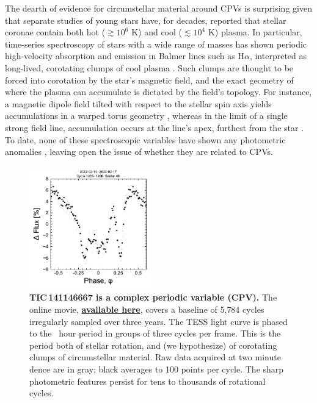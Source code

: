 \documentclass[11pt,twocolumn,tighten,linenumbers]{aastex7}
\begin{document}
The dearth of evidence for circumstellar material around CPVs is
surprising given that separate studies of young stars have, for
decades, reported that stellar coronae contain both hot
($\gtrsim$$10^6$ K) and cool ($\lesssim$$10^4$ K) plasma. In
particular, time-series spectroscopy of stars with a wide range of
masses has shown periodic high-velocity absorption and emission in
Balmer lines such as H$\alpha$, interpreted as long-lived, corotating
clumps of cool plasma
\citep{CollierCameron1989,CollierCameron1992,Barnes2000,Donati2000,Dunstone2006,Skelly2008,Leitzinger2016,Cang2021}.
Such clumps are thought to be forced into corotation by the star's magnetic
field, and the exact geometry of where the plasma can accumulate is
dictated by the field's topology.  For instance, a magnetic dipole
field tilted with respect to the stellar spin axis yields
accumulations in a warped torus geometry \citep{Townsend2005}, whereas
in the limit of a single strong field line, accumulation occurs at the
line's apex, furthest from the star \citep{Waugh2022}.  To date, none
of these spectroscopic variables have shown any photometric anomalies
\citep{Bouma2024}, leaving open the issue of whether they are related
to CPVs.

\begin{figure}[!t]
  \centering
  \includegraphics[width=0.47\textwidth]{figures/f1.pdf}
  \vspace{-0.3cm}
  \captionsetup{labelformat=moviefmt,labelsep=colon}
	\caption{\textbf{TIC\,141146667 is a complex periodic variable (CPV).}  The
online movie,
  \href{https://lgbouma.com/movies/TIC141146667_20250116.mp4}{{\bf
  available here}},
  covers a baseline of 5{,}784 cycles irregularly sampled over three
  years.  The TESS light curve is phased to the \periodhr\ hour period
  in groups of three cycles per frame.  This is the period both of
  stellar rotation, and (we hypothesize) of corotating clumps of
  circumstellar material.  Raw data acquired at two minute dence
  are in gray; black averages to 100 points per cycle.  
  The sharp photometric features persist
  for tens to thousands of rotational cycles. }
  \label{fig:lc}
\end{figure}
\end{document}
